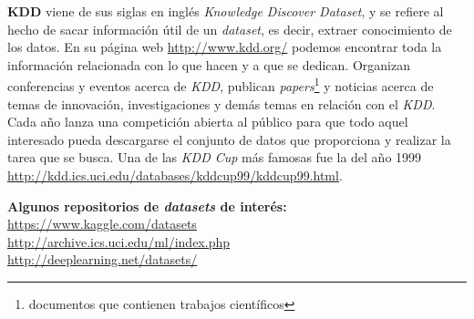\vspace*{1cm}

\noindent\textbf{KDD} viene de sus siglas en inglés \textit{Knowledge Discover Dataset}, y se refiere al hecho 
de sacar información útil de un \textit{dataset}, es decir, extraer conocimiento de los datos.
En su página web \url{http://www.kdd.org/} podemos encontrar toda la información relacionada con lo 
que hacen y a que se dedican. Organizan conferencias y eventos acerca de \textit{KDD}, 
publican \textit{papers}\footnote{documentos que contienen trabajos científicos}
y noticias acerca de temas de innovación, investigaciones y demás temas en relación con el \textit{KDD}.
Cada año lanza una competición abierta al público para que todo aquel interesado pueda descargarse 
el conjunto de datos que proporciona y realizar la tarea que se busca. Una de las \textit{KDD Cup} más famosas 
fue la del año 1999 \url{http://kdd.ics.uci.edu/databases/kddcup99/kddcup99.html}.
\newline

\vfill

\noindent \textbf{Algunos repositorios de \textit{datasets} de interés:}\\
\url{https://www.kaggle.com/datasets}\\
\url{http://archive.ics.uci.edu/ml/index.php}\\
\url{http://deeplearning.net/datasets/}\\


